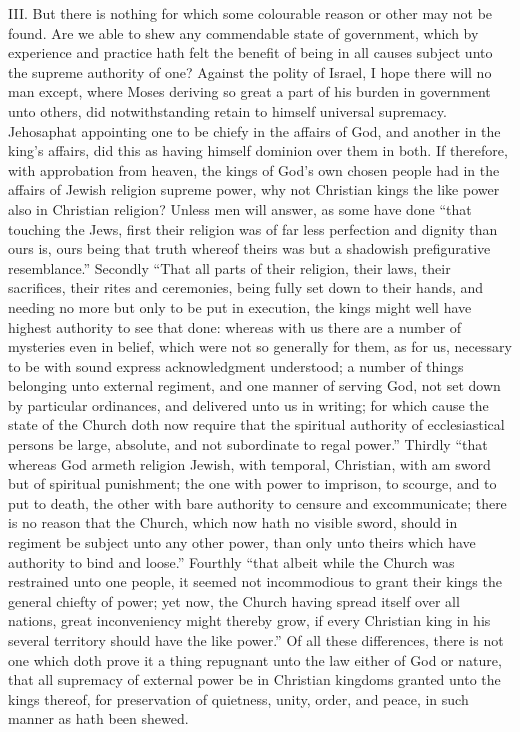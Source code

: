 III. But there is nothing for which some colourable reason or other may not be found. Are we able to shew any commendable state of government, which by experience and practice hath felt the benefit of being in all causes subject unto the supreme authority of one? Against the polity of  Israel, I hope there will no man except, where Moses deriving so great a part of his burden in government unto others, did notwithstanding retain to himself universal supremacy. Jehosaphat appointing one to be chiefy in the affairs of God, and another in the king’s affairs, did this as having himself dominion over them in both. If therefore, with approbation from heaven, the kings of God’s own chosen people had in the affairs of Jewish religion supreme power, why not Christian kings the like power also in Christian religion? Unless men will answer, as some have done “that touching the Jews, first their religion was of far less perfection and dignity than ours is, ours being that truth whereof theirs was but a shadowish prefigurative resemblance.” Secondly “That all parts of their religion, their laws, their sacrifices, their rites and ceremonies, being fully set down to their hands, and needing no more but only to be put in execution, the kings might well have highest authority to see that done: whereas with us there are a number of mysteries even in belief, which were not so generally for them, as for us, necessary to be with sound express acknowledgment understood; a number of things belonging unto external regiment, and one manner of serving God, not set down by particular ordinances, and  delivered unto us in writing; for which cause the state of the Church doth now require that the spiritual authority of ecclesiastical persons be large, absolute, and not subordinate to regal power.” Thirdly “that whereas God armeth religion Jewish, with temporal, Christian, with am sword but of spiritual punishment; the one with power to imprison, to scourge, and to put to death, the other with bare authority to censure and excommunicate; there is no reason that the Church, which now hath no visible sword, should in regiment be subject unto any other power, than only unto theirs which have authority to bind and loose.” Fourthly “that albeit while the Church was restrained unto one people, it seemed not incommodious to grant their kings the general chiefty of power; yet now, the Church having spread itself over all nations, great inconveniency might thereby grow, if every Christian king in his several territory should have the like power.” Of all these differences, there is not one which doth prove it a thing repugnant unto the law either of God or nature, that all supremacy of external power be in Christian kingdoms granted unto the kings thereof, for preservation of quietness, unity, order, and peace, in such manner as hath been shewed.


